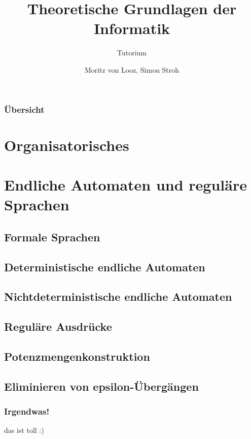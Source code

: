 \documentclass{beamer}
\title{Theoretische Grundlagen der Informatik}
\subtitle{Tutorium}
\author{Moritz von Looz, Simon Stroh}
\institute[ITI]{Intitute für Theoretische Informatik}
\begin{document}
\begin{frame}
  \maketitle
\end{frame}

\begin{frame}
  \frametitle{Übersicht}
  \tableofcontents
\end{frame}

\section{Organisatorisches}
\section{Endliche Automaten und reguläre Sprachen}
\subsection{Formale Sprachen}
\subsection{Deterministische endliche Automaten}
\subsection{Nichtdeterministische endliche Automaten}
\subsection{Reguläre Ausdrücke}
\subsection{Potenzmengenkonstruktion}
\subsection{Eliminieren von epsilon-Übergängen}
\begin{frame}
 \frametitle{Irgendwas!}
 das ist toll :)
\end{frame}
\end{document}
